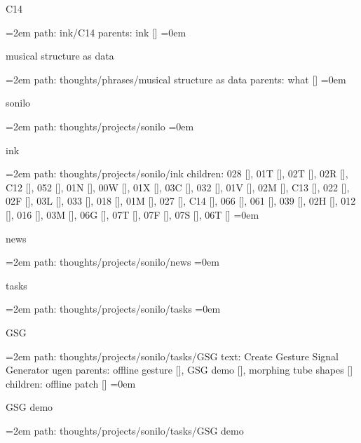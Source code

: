 \bigskip
{}
C14
\smallskip
\par\begingroup
\leftskip=2em
path: ink/C14
\smallskip
parents:  ink []
\smallskip
\leftskip=0em
\par\endgroup
\bigskip
{}
musical structure as data
\smallskip
\par\begingroup
\leftskip=2em
path: thoughts/phrases/musical structure as data
\smallskip
parents:  what []
\smallskip
\leftskip=0em
\par\endgroup
\bigskip
{}
sonilo
\smallskip
\par\begingroup
\leftskip=2em
path: thoughts/projects/sonilo
\smallskip
\leftskip=0em
\par\endgroup
\bigskip
{}
ink
\smallskip
\par\begingroup
\leftskip=2em
path: thoughts/projects/sonilo/ink
\smallskip
children: 028 [], 01T [], 02T [], 02R [], C12 [], 052 [], 01N [], 00W [], 01X [], 03C [], 032 [], 01V [], 02M [], C13 [], 022 [], 02F [], 03L [], 033 [], 018 [], 01M [], 027 [], C14 [], 066 [], 061 [], 039 [], 02H [], 012 [], 016 [], 03M [], 06G [], 07T [], 07F [], 07S [], 06T []
\smallskip
\leftskip=0em
\par\endgroup
\bigskip
{}
news
\smallskip
\par\begingroup
\leftskip=2em
path: thoughts/projects/sonilo/news
\smallskip
\leftskip=0em
\par\endgroup
\bigskip
{}
tasks
\smallskip
\par\begingroup
\leftskip=2em
path: thoughts/projects/sonilo/tasks
\smallskip
\leftskip=0em
\par\endgroup
\bigskip
{}
GSG
\smallskip
\par\begingroup
\leftskip=2em
path: thoughts/projects/sonilo/tasks/GSG
\smallskip
text:  Create Gesture Signal Generator ugen
\smallskip
parents:  offline gesture [], GSG demo [], morphing tube shapes []
\smallskip
children: offline patch []
\smallskip
\leftskip=0em
\par\endgroup
\bigskip
{}
GSG demo
\smallskip
\par\begingroup
\leftskip=2em
path: thoughts/projects/sonilo/tasks/GSG demo
